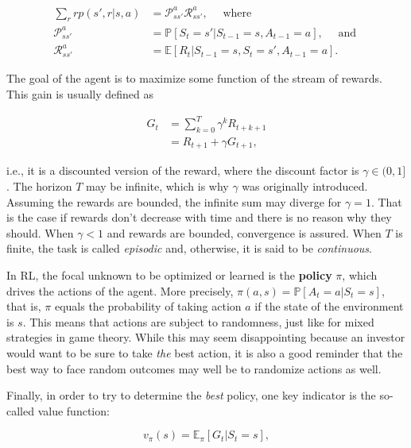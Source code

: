 \begin{equation}
\label{eq-transprob2}
\begin{aligned}
\sum_r rp(s',r|s,a)&=\mathcal{P}_{ss'}^a \mathcal{R}_{ss'}^a, \quad \text{ where } \\
\mathcal{P}_{ss'}^a &=\mathbb{P}\left[S_t=s' | S_{t-1}=s,A_{t-1}=a \right],  \quad \text{ and } \\
 \mathcal{R}_{ss'}^a &= \mathbb{E}\left[R_t | S_{t-1}=s,S_t=s', A_{t-1}=a \right].
\end{aligned}
\end{equation}

The goal of the agent is to maximize some function of the stream of rewards. This gain is usually defined as

\begin{equation}
\label{eq-gain}
\begin{aligned}
G_t&=\sum_{k=0}^T\gamma^kR_{t+k+1} \\
&=R_{t+1} +\gamma G_{t+1},
\end{aligned}
\end{equation}

i.e., it is a discounted version of the reward, where the discount factor is $\gamma \in (0,1]$. The horizon $T$ may be infinite, which is why $\gamma$ was originally introduced. Assuming the rewards are bounded, the infinite sum may diverge for $\gamma=1$. That is the case if rewards don't decrease with time and there is no reason why they should.
When $\gamma <1$ and rewards are bounded, convergence is assured. When $T$ is finite, the task is called \textit{episodic} and, otherwise, it is said to be \textit{continuous}.

In RL, the focal unknown to be optimized or learned is the \textbf{policy} $\pi$, which drives the actions of the agent. More precisely, $\pi(a,s)=\mathbb{P}[A_t=a|S_t=s]$, that is, $\pi$ equals the probability of taking action $a$ if the state of the environment is $s$. This means that actions are subject to randomness, just like for mixed strategies in game theory. While this may seem disappointing because an investor would want to be sure to take \textit{the} best action, it is also a good reminder that the best way to face random outcomes may well be to randomize actions as well.

Finally, in order to try to determine the \textit{best} policy, one key indicator is the so-called value function:

\begin{equation}
\label{eq-RLvalue}
v_\pi(s)=\mathbb{E}_\pi\left[ G_t | S_t=s \right],
\end{equation}

